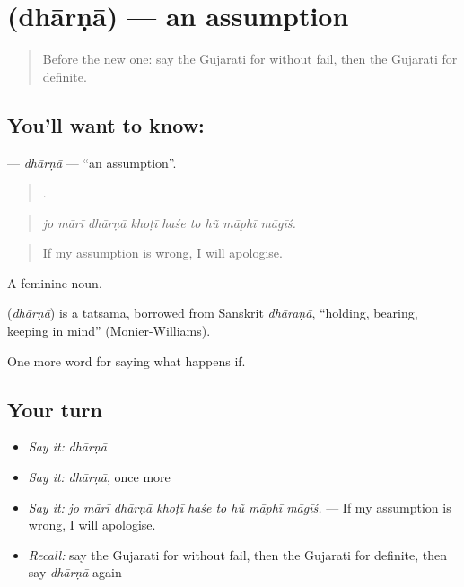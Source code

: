 \section[\texorpdfstring{\gu{ધારણા} (dhārṇā)}{ધારણા (dhārṇā)}]{ (dhārṇā) — an assumption}

\label{lesson:GU-C367-dharna}



\begin{quote}
Before the new one: say the Gujarati for without fail, then the Gujarati for definite.
\end{quote}

\subsection*{You'll want to know: }
\textbf{} — \emph{dhārṇā} — \textquotedblleft{}an assumption\textquotedblright{}.

\begin{quote}
        .
\end{quote}

\begin{quote}
\emph{jo mārī dhārṇā khoṭī haśe to hũ māphī māgīś.}
\end{quote}

\begin{quote}
If my assumption is wrong, I will apologise.
\end{quote}

A feminine noun.

\begin{cousinweb}
\textbf{} (\emph{dhārṇā}) is a tatsama, borrowed from Sanskrit \emph{dhāraṇā}, \textquotedblleft{}holding, bearing, keeping in mind\textquotedblright{} (Monier-Williams).
\end{cousinweb}

\begin{grammarlens}[title={What you've built}]
One more word for saying what happens if.
\end{grammarlens}

\subsection*{Your turn}
\begin{itemize}
\raggedright
  \item \emph{Say it:} \emph{dhārṇā}
  \item \emph{Say it:} \emph{dhārṇā}, once more
  \item \emph{Say it:} \emph{jo mārī dhārṇā khoṭī haśe to hũ māphī māgīś.} — If my assumption is wrong, I will apologise.
  \item \emph{Recall:} say the Gujarati for without fail, then the Gujarati for definite, then say \emph{dhārṇā} again
\end{itemize}

